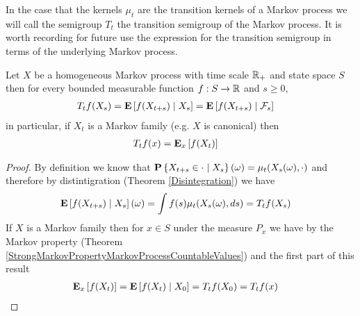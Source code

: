 In the case that the kernels $\mu_t$ are the transition kernels of a Markov process we will call the semigroup $T_t$ the transition semigroup of the Markov process.  It is worth
recording for future use the expression for the transition semigroup in terms of the underlying Markov process.
\begin{prop}\label{TransitionSemigroupAsExpectation}Let $X$ be a homogeneous Markov process with time scale $\reals_+$ and state space $S$ then for every bounded measurable function $f : S \to \reals$ and $s \geq 0$,
\begin{align*} 
T_t f (X_s) &= \cexpectationlong{X_s}{f(X_{t+s})} = \cexpectationlong{\mathcal{F}_s}{f(X_{t+s})} 
\end{align*}
in particular, if $X_t$ is a Markov family (e.g. $X$ is canonical) then
\begin{align*} 
T_t f (x) &= \sexpectation{f(X_t)}{x}
\end{align*}
\end{prop}
\begin{proof}
By definition we know that $\cprobability{X_s}{X_{t+s} \in \cdot} (\omega) = \mu_t(X_s(\omega), \cdot)$ and therefore by distintigration (Theorem \ref{Disintegration}) we have 
\begin{align*}
\cexpectationlong{X_s}{f(X_{t+s})}(\omega) &= \int f(s) \mu_t(X_s(\omega), ds) = T_t f(X_s)
\end{align*}
If $X$ is a Markov family then for $x \in S$ under the measure $P_x$ we have by the Markov property (Theorem \ref{StrongMarkovPropertyMarkovProcessCountableValues}) and the
first part of this result
\begin{align*}
\sexpectation{f(X_t)}{x} &= \cexpectationlong{X_0}{f(X_{t})} = T_t f(X_0) = T_t f(x)
\end{align*}
\end{proof}

